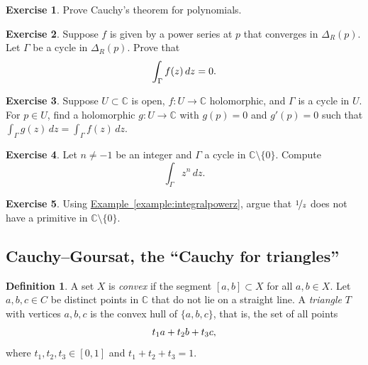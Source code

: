 \documentclass[12pt,openany]{book}
\newcommand{\avoidbreak}{\postdisplaypenalty=100}
\newcommand{\C}{{\mathbb{C}}}
\newcommand{\myindex}[1]{#1\index{#1}}
\newcommand{\myquote}[1]{``#1''}
\theoremstyle{plain}
\theoremstyle{remark}
\theoremstyle{definition}
\newtheorem{defn}[thm]{Definition}
\newenvironment{exbox}{%
    \def\FrameCommand{\vrule width 1pt \relax\hspace{10pt}}%
    \MakeFramed{\advance\hsize-\width\FrameRestore}%
}{%
    \endMakeFramed
}
\theoremstyle{exercise}
\newtheorem{exercise}{Exercise}[section]
\theoremstyle{example}
\newcommand{\exerciseref}[1]{\hyperref[#1]{Exercise~\ref*{#1}}}
\newcommand{\exampleref}[1]{\hyperref[#1]{Example~\ref*{#1}}}
\begin{document}
\begin{exbox}
\begin{exercise}
Prove Cauchy's theorem for polynomials.
\end{exercise}

\begin{exercise}
Suppose $f$ is given by a power series at $p$ that converges in $\Delta_R(p)$.  Let
$\Gamma$ be a cycle in $\Delta_R(p)$.  Prove that
\begin{equation*}
\int_\Gamma f(z) \, dz = 0 .
\avoidbreak
\end{equation*}
\end{exercise}

\begin{exercise}
Suppose $U \subset \C$ is open, $f \colon U \to \C$ holomorphic, and
$\Gamma$ is a cycle in $U$.  
For $p \in U$, find a holomorphic $g \colon U \to \C$ with $g(p) = 0$
and $g'(p) = 0$ such that $\int_\Gamma g(z)\, dz = \int_\Gamma f(z) \, dz$.
\end{exercise}

\begin{exercise}
Let $n\not=-1$ be an integer and $\Gamma$ a cycle in $\C \setminus \{ 0 \}$.
Compute
\begin{equation*}
\int_\Gamma z^n \, dz .
\end{equation*}
\end{exercise}

\begin{exercise}
Using \exampleref{example:integralpowerz}, argue that $\nicefrac{1}{z}$ does
not have a primitive in $\C \setminus \{ 0 \}$.
\end{exercise}
\end{exbox}

\subsection{Cauchy--Goursat, the \myquote{Cauchy for triangles}}

\begin{defn}
A set $X$ is \emph{\myindex{convex}} if the segment $[a,b] \subset X$ for all $a,b \in
X$.
Let $a,b,c \in C$ be distinct points in $\C$ that do not lie on a
straight line.
A \emph{\myindex{triangle}} $T$
with vertices $a,b,c$ is the convex hull
of $\{ a,b,c \}$, that is,
the set of all points
\begin{equation*}
t_1 a + t_2 b + t_3 c ,
\avoidbreak
\end{equation*}
where $t_1,t_2,t_3 \in [0,1]$ and $t_1+t_2+t_3 = 1$.
\end{defn}
\end{document}
